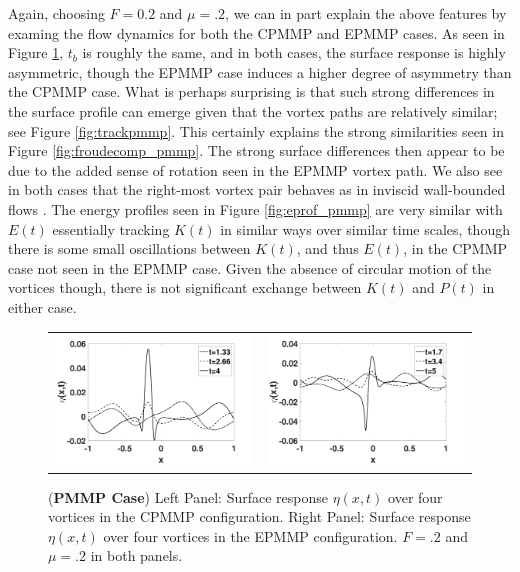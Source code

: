 \documentclass[a4paper,11pt]{article}
\begin{document}
Again, choosing $F=0.2$ and $\mu=.2$, we can in part explain the above features by examing the flow dynamics for both the CPMMP and EPMMP cases.  As seen in Figure \ref{fig:surfreppmmp}, $t_{b}$ is roughly the same, and in both cases, the surface response is highly asymmetric, though the EPMMP case induces a higher degree of asymmetry than the CPMMP case.  What is perhaps surprising is that such strong differences in the surface profile can emerge given that the vortex paths are relatively similar; see Figure \ref{fig:trackpmmp}.  This certainly explains the strong similarities seen in Figure \ref{fig:froudecomp_pmmp}.  The strong surface differences then appear to be due to the added sense of rotation seen in the EPMMP vortex path.  We also see in both cases that the right-most vortex pair behaves as in inviscid wall-bounded flows \cite{lamb}.  The energy profiles seen in Figure \ref{fig:eprof_pmmp}     are very similar with $E(t)$ essentially tracking $K(t)$ in similar ways over similar time scales, though there is some small oscillations between $K(t)$, and thus $E(t)$, in the CPMMP case not seen in the EPMMP case. Given the absence of circular motion of the vortices though, there is not significant exchange between $K(t)$ and $P(t)$ in either case.   
\begin{figure}[!h]
\centering
\begin{tabular}{cc}
\includegraphics[width=.5\textwidth]{surf_resp_mu_pt2_F_pt2_pmmp} & 
\includegraphics[width=.5\textwidth]{surf_resp_mu_pt2_F_pt2_pmmp_sym}
\end{tabular}
\caption{\small ({\bf PMMP Case}) Left Panel: Surface response $\eta(x,t)$ over four vortices in the CPMMP configuration. Right Panel: Surface response $\eta(x,t)$ over four vortices in the EPMMP configuration.  $F=.2$ and $\mu=.2$ in both panels.}
\label{fig:surfreppmmp}
\end{figure}
\end{document}
